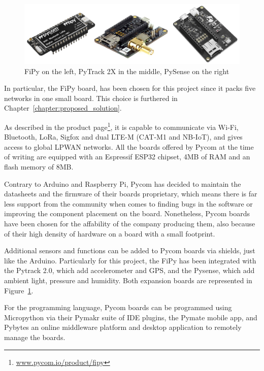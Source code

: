			\begin{figure}
				\centering
				\includegraphics[width=\textwidth]{resources/img/chap3/pycom_board}
				\caption{FiPy on the left, PyTrack 2X in the middle, PySense on the right}
				\label{img:pycom_board}
			\end{figure}	
			
			In particular, the FiPy board, has been chosen for this project since it packs five networks in one small board.
			This choice is furthered in Chapter~\ref{chapter:proposed_solution}.
			
			As described in the product page\footnote{ \url{www.pycom.io/product/fipy}}, it is capable to communicate via Wi-Fi, Bluetooth, LoRa, Sigfox and dual LTE-M (CAT-M1 and NB-IoT), and gives access to global LPWAN networks.
			All the boards offered by Pycom at the time of writing are equipped with an Espressif ESP32 chipset, 4MB of RAM and an flash memory of 8MB.
			
			Contrary to Arduino and Raspberry Pi, Pycom has decided to maintain the datasheets and the firmware of their boards proprietary, which means there is far less support from the community when comes to finding bugs in the software or improving the component placement on the board.
			Nonetheless, Pycom boards have been chosen for the affability of the company producing them, also because of their high density of hardware on a board with a small footprint.
			
			Additional sensors and functions can be added to Pycom boards via shields, just like the Arduino.
			Particularly for this project, the FiPy has been integrated with the Pytrack 2.0, which add accelerometer and GPS, and the Pysense, which add ambient light, pressure and humidity.
			Both expansion boards are represented in Figure~\ref{img:pycom_board}.
					
			For the programming language, Pycom boards can be programmed using Micropython via their Pymakr suite of IDE plugins, the Pymate mobile app, and Pybytes an online middleware platform and desktop application to remotely manage the boards.
			
